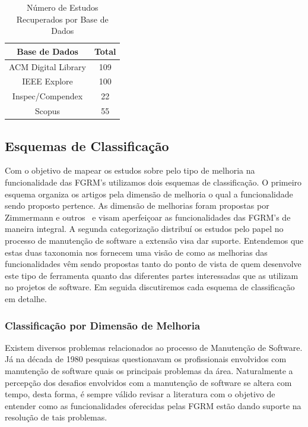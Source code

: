 \begin{table}[htb] \centering \caption{Número de Estudos Recuperados por Base de
		Dados}\label{tab:estudos-por-base-dados} \begin{tabular}{cc} \hline
		\textbf{Base de Dados} & \textbf{Total} \\ \hline ACM Digital Library
		& 109            \\ IEEE Explore           & 100            \\
		Inspec/Compendex       & 22             \\ Scopus                 & 55
		\\ \hline \end{tabular}

\end{table}

\subsection{Esquemas de Classificação}
\label{subsec:map-esquemas-classificacao}

Com o objetivo de mapear os estudos sobre pelo tipo de melhoria na
funcionalidade das FGRM's utilizamos dois esquemas de classificação. O primeiro
esquema organiza os artigos pela dimensão de melhoria o qual a funcionalidade
sendo proposto pertence. As dimensão de melhorias foram propostas por Zimmermann
e outros~\cite{zimmermann2009improving} e visam aperfeiçoar as funcionalidades
das FGRM's de maneira integral. A segunda categorização distribuí os estudos
pelo papel no processo de manutenção de software a extensão visa dar suporte.
Entendemos que estas duas taxonomia nos fornecem uma visão de como as melhorias
das funcionalidades vêm sendo propostas tanto do ponto de vista de quem
desenvolve este tipo de ferramenta quanto das diferentes partes interessadas que as
utilizam no projetos de software. Em seguida discutiremos cada esquema de
classificação em detalhe.

\subsubsection{Classificação por Dimensão de Melhoria} 
\label{subsubsec:map-esquema-suporte-problema}

Existem diversos problemas relacionados ao processo de Manutenção de Software.
Já na década de 1980 pesquisas questionavam os profissionais envolvidos com
manutenção de software quais os principais problemas da
área\cite{Lientz:1981:PAS:358790.358796}. Naturalmente a percepção dos desafios
envolvidos com a manutenção de software se altera com tempo, desta forma, é
sempre válido revisar a literatura com o objetivo de entender como as
funcionalidades oferecidas pelas FGRM estão dando suporte na resolução de tais
problemas.

